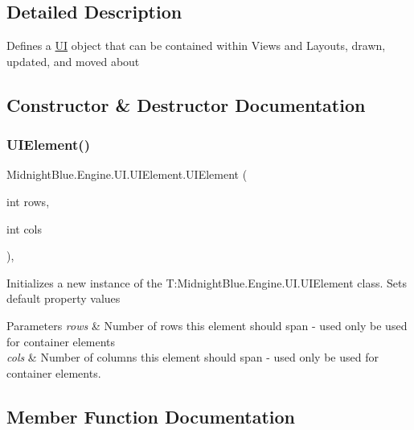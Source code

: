 \subsection{Detailed Description}
Defines a \hyperlink{namespace_midnight_blue_1_1_engine_1_1_u_i}{UI} object that can be contained within Views and Layouts, drawn, updated, and moved about 



\subsection{Constructor \& Destructor Documentation}
\hypertarget{class_midnight_blue_1_1_engine_1_1_u_i_1_1_u_i_element_a89589f3049d81f74716e979f9db8b6d5}{}\label{class_midnight_blue_1_1_engine_1_1_u_i_1_1_u_i_element_a89589f3049d81f74716e979f9db8b6d5} 
\subsubsection{\texorpdfstring{U\+I\+Element()}{UIElement()}}
{\footnotesize\ttfamily Midnight\+Blue.\+Engine.\+U\+I.\+U\+I\+Element.\+U\+I\+Element (\begin{DoxyParamCaption}\item[{int}]{rows,  }\item[{int}]{cols }\end{DoxyParamCaption})\hspace{0.3cm}{\ttfamily [inline]}, {\ttfamily [protected]}}



Initializes a new instance of the T\+:\+Midnight\+Blue.\+Engine.\+U\+I.\+U\+I\+Element class. Sets default property values 


\begin{DoxyParams}{Parameters}
{\em rows} & Number of rows this element should span -\/ used only be used for container elements \\
\hline
{\em cols} & Number of columns this element should span -\/ used only be used for container elements. \\
\hline
\end{DoxyParams}


\subsection{Member Function Documentation}
\hypertarget{class_midnight_blue_1_1_engine_1_1_u_i_1_1_u_i_element_a0faa27f642478cd428c4718f66263325}{}\label{class_midnight_blue_1_1_engine_1_1_u_i_1_1_u_i_element_a0faa27f642478cd428c4718f66263325} 
